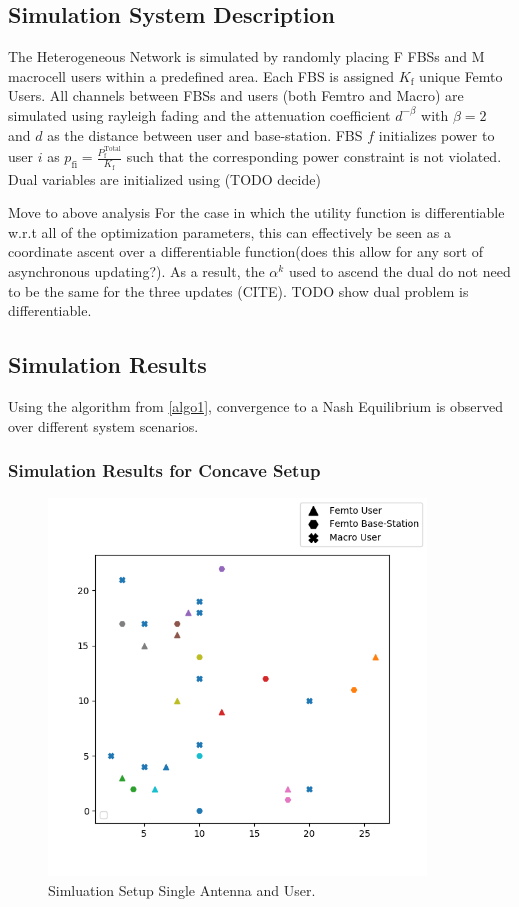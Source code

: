 \documentclass[12pt,a4paper]{report}
\begin{document}
\subsection{Simulation System Description}
The Heterogeneous Network is simulated by randomly placing F FBSs and M macrocell users within a predefined area. Each FBS is assigned $K_{\mathrm{f}}$ unique Femto Users. All channels between FBSs and users (both Femtro and Macro) are simulated using rayleigh fading and the attenuation coefficient $d^{- \beta}$ with $\beta =2$ and $d$ as the distance between user and base-station.
FBS $f$ initializes power to user $i$ as $p_{\mathrm{fi}} = \frac{{P_{\mathrm{f}}^{\text{Total}}}}{K_{\mathrm{f}}} $ such that the corresponding power constraint is not violated. 
Dual variables are initialized using  (TODO decide)
\par
Move to above analysis
For the case in which the utility function is differentiable w.r.t all of the optimization parameters, this can effectively be seen as a coordinate ascent over a differentiable function(does this allow for any sort of asynchronous updating?). As a result, the $\alpha^{k}$ used to ascend the dual do not need to be the same for the three updates (CITE).
TODO show dual problem is differentiable.


\subsection{Simulation Results}
Using the algorithm from \ref{algo1}, convergence to a Nash Equilibrium is observed over different system scenarios. 
\subsubsection{Simulation Results for Concave Setup}

\begin{figure}[H]
	\includegraphics[width=\textwidth,height = 10cm]{figures/system_figure_single}
	  \caption{Simluation Setup Single Antenna and User.  }
\end{figure}
\end{document}
